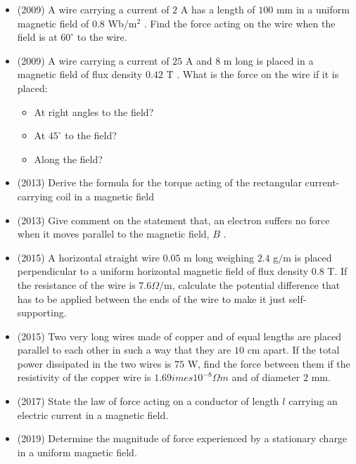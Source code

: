 \documentclass{article}
\begin{document}
\begin{itemize}
\item (2009)  A wire carrying a current of $ 2$ A has a length of $ 100$ mm in a uniform magnetic field of $ 0.8$ Wb$/$m$ ^{2}$ .  Find the force acting on the wire when the field is at $ 60^{\circ}$ to the wire.
\item (2009)  A wire carrying a current of $ 25$ A and $ 8$ m long is placed in a magnetic field of flux density $ 0.42$ T . What is the force on the wire if it is placed:\begin{itemize}
\item At right angles to the field?
\item At $ 45^{\circ}$ to the field?
\item Along the field?
\end{itemize}
\item (2013)  Derive the formula for the torque acting of the rectangular current-carrying coil in a magnetic field
\item (2013)  Give comment on the statement that, an electron suffers no force when it moves parallel to the magnetic field, $ B$ .
\item (2015)  A horizontal straight wire $ 0.05$ m long weighing $ 2.4$ g$/$m is placed perpendicular to a uniform horizontal magnetic field of flux density $ 0.8$ T.  If the resistance of the wire is $ 7.6\Omega /$m, calculate the potential difference that has to be applied between the ends of the wire to make it just self-supporting.
\item (2015)  Two very long wires made of copper and of equal lengths are placed parallel to each other in such a way that they are $ 10$ cm apart.  If the total power dissipated in the two wires is $ 75$ W, find the force between them if the resistivity of the copper wire is $ 1.69	imes 10^{-8}\Omega m$ and of diameter $ 2$ mm.
\item (2017)  State the law of force acting on a conductor of length $ l$ carrying an electric current in a magnetic field. 
\item (2019)  Determine the magnitude of force experienced by a stationary charge in a uniform magnetic field. 
\end{itemize}
\end{document}
